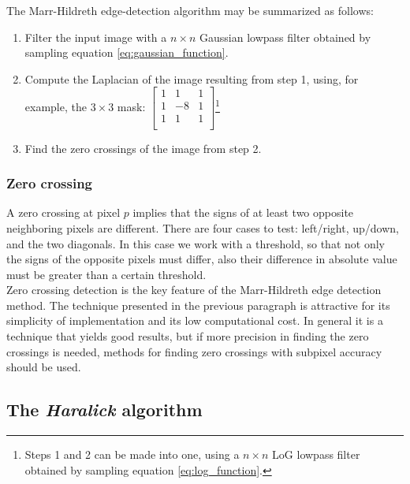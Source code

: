 \documentclass{ipol}
\numberwithin{equation}{section}
\numberwithin{table}{section}
\numberwithin{figure}{section}
\begin{document}
The Marr-Hildreth edge-detection algorithm may be summarized as follows:
\begin{enumerate}
	\item Filter the input image with a $n \times n$ Gaussian lowpass filter obtained by sampling equation \ref{eq:gaussian_function}.
	\item Compute the Laplacian of the image resulting from step 1, using, for example, the $3\times3$ mask:
			$\begin{bmatrix}
			1 &  1 & 1 \\
			1 & -8 & 1 \\
			1 &  1 & 1 \\
			\end{bmatrix}$\footnote{Steps 1 and 2 can be made into one, using a $n\times n$ LoG lowpass filter obtained by sampling equation \ref{eq:log_function}.}
	\item Find the zero crossings of the image from step 2.
\end{enumerate}

\subsubsection{Zero crossing}

A zero crossing at pixel $p$ implies that the signs of at least two opposite neighboring pixels are 
different. There are four cases to test: left/right, up/down, and the two diagonals. In this case 
we work with a threshold, so that not only the signs of the opposite pixels must differ, also their 
difference in absolute value must be greater than a certain threshold.\\

Zero crossing detection is the key feature of the Marr-Hildreth edge detection method. The technique 
presented in the previous paragraph is attractive for its simplicity of implementation and its low 
computational cost. In general it is a technique that yields good results, but if more precision in 
finding the zero crossings is needed, methods for finding zero crossings with subpixel accuracy 
should be used.\\

\subsection{The \textit{Haralick} algorithm}
\end{document}
